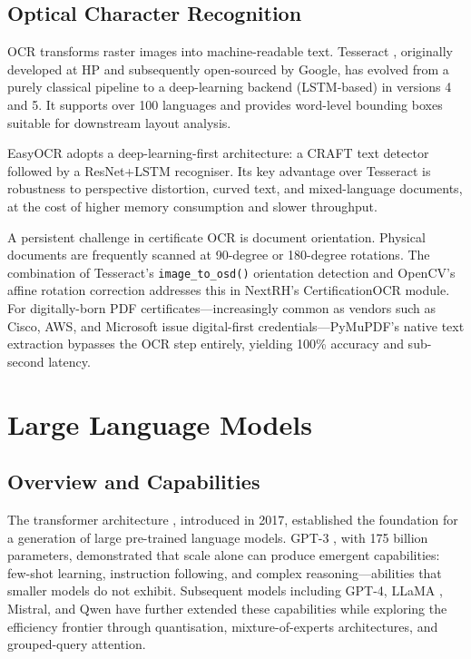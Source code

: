 \documentclass[12pt,a4paper,oneside,openany]{report}
\begin{document}
\subsection{Optical Character Recognition}
\ac{OCR} transforms raster images into machine-readable text. Tesseract \cite{smith2007overview}, originally developed at HP and subsequently open-sourced by Google, has evolved from a purely classical pipeline to a deep-learning backend (LSTM-based) in versions 4 and 5. It supports over 100 languages and provides word-level bounding boxes suitable for downstream layout analysis.

EasyOCR \cite{easyocr} adopts a deep-learning-first architecture: a CRAFT text detector followed by a ResNet+LSTM recogniser. Its key advantage over Tesseract is robustness to perspective distortion, curved text, and mixed-language documents, at the cost of higher memory consumption and slower throughput.

A persistent challenge in certificate \ac{OCR} is document orientation. Physical documents are frequently scanned at 90-degree or 180-degree rotations. The combination of Tesseract's \texttt{image\_to\_osd()} orientation detection and OpenCV's affine rotation correction \cite{bradski2000opencv} addresses this in NextRH's CertificationOCR module. For digitally-born PDF certificates---increasingly common as vendors such as Cisco, AWS, and Microsoft issue digital-first credentials---PyMuPDF's native text extraction bypasses the \ac{OCR} step entirely, yielding 100\% accuracy and sub-second latency.

\section{Large Language Models}

\subsection{Overview and Capabilities}
The transformer architecture \cite{vaswani2017attention}, introduced in 2017, established the foundation for a generation of large pre-trained language models. GPT-3 \cite{brown2020language}, with 175 billion parameters, demonstrated that scale alone can produce emergent capabilities: few-shot learning, instruction following, and complex reasoning---abilities that smaller models do not exhibit. Subsequent models including GPT-4, LLaMA \cite{touvron2023llama}, Mistral, and Qwen \cite{bai2023qwen} have further extended these capabilities while exploring the efficiency frontier through quantisation, mixture-of-experts architectures, and grouped-query attention.
\end{document}
